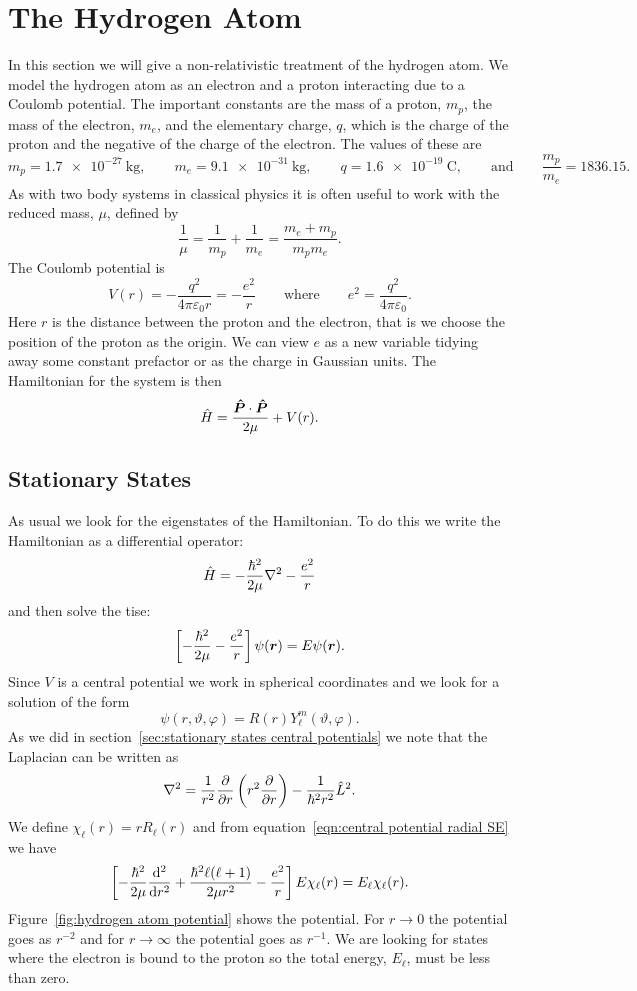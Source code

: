 \section{The Hydrogen Atom}
In this section we will give a non-relativistic treatment of the hydrogen atom.
We model the hydrogen atom as an electron and a proton interacting due to a Coulomb potential.
The important constants are the mass of a proton, \(m_p\), the mass of the electron, \(m_e\), and the elementary charge, \(q\), which is the charge of the proton and the negative of the charge of the electron.
The values of these are
\[m_p = \SI{1.7e-27}{\kilogram}, \qquad m_e = \SI{9.1e-31}{\kilogram}, \qquad q = \SI{1.6e-19}{\coulomb}, \qquad\text{and}\qquad \frac{m_p}{m_e} = 1836.15.\]
As with two body systems in classical physics it is often useful to work with the reduced mass, \(\mu\), defined by
\[\frac{1}{\mu} = \frac{1}{m_p} + \frac{1}{m_e} = \frac{m_e + m_p}{m_pm_e}.\]
The Coulomb potential is
\[V(r) = -\frac{q^2}{4\pi\varepsilon_0r} = -\frac{e^2}{r}\qquad\text{where}\qquad e^2 = \frac{q^2}{4\pi\varepsilon_0}.\]
Here \(r\) is the distance between the proton and the electron, that is we choose the position of the proton as the origin.
We can view \(e\) as a new variable tidying away some constant prefactor or as the charge in Gaussian units.
The Hamiltonian for the system is then
\[\hat{H} = \frac{\bm{\hat{P}}\cdot\bm{\hat{P}}}{2\mu} + V(r).\]

\subsection{Stationary States}\label{sec:stationary states hydrogen atom}
As usual we look for the eigenstates of the Hamiltonian.
To do this we write the Hamiltonian as a differential operator:
\[\hat{H} = -\frac{\hbar^2}{2\mu}\nabla^2 - \frac{e^2}{r}\]
and then solve the \gls{tise}:
\[\left[-\frac{\hbar^2}{2\mu} - \frac{e^2}{r}\right]\psi(\bm{r}) = E\psi(\bm{r}).\]
Since \(V\) is a central potential we work in spherical coordinates and we look for a solution of the form
\[\psi(r, \vartheta, \varphi) = R(r)Y_\ell^m(\vartheta, \varphi).\]
As we did in section~\ref{sec:stationary states central potentials} we note that the Laplacian can be written as
\[\nabla^2 = \frac{1}{r^2}\pdv{r}\left(r^2\pdv{r}\right) - \frac{1}{\hbar^2r^2}\hat{L}^2.\]
We define \(\chi_\ell(r) = rR_\ell(r)\) and from equation~\ref{eqn:central potential radial SE} we have
\[\left[-\frac{\hbar^2}{2\mu}\dv[2]{r} + \frac{\hbar^2\ell(\ell + 1)}{2\mu r^2} - \frac{e^2}{r}\right]E\chi_\ell(r) = E_\ell\chi_\ell(r).\]
Figure~\ref{fig:hydrogen atom potential} shows the potential.
For \(r \to 0\) the potential goes as \(r^{-2}\) and for \(r\to \infty\) the potential goes as \(r^{-1}\).
We are looking for states where the electron is bound to the proton so the total energy, \(E_\ell\), must be less than zero.


